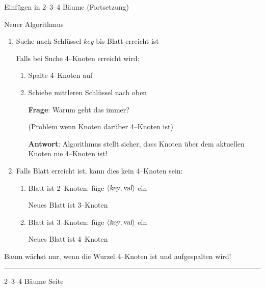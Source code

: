 
\begin{slide}{}
\normalsize

\begin{center}
Einf\"ugen in 2--3--4 B\"aume (Fortsetzung)
\end{center}
\vspace*{0.5cm}

\footnotesize
Neuer Algorithmus
\begin{enumerate}
\item Suche nach Schl\"ussel \textsl{key} bis Blatt erreicht ist

      Falls bei Suche 4--Knoten erreicht wird:
      \begin{enumerate}
      \item Spalte 4--Knoten auf
      \item Schiebe mittleren Schl\"ussel nach oben

            \textbf{Frage}: Warum geht das immer?
           
            (Problem wenn Knoten dar\"uber 4--Knoten ist)
            \vspace*{0.5cm}

            \textbf{Antwort}: Algorithmus stellt sicher, dass Knoten \"uber dem aktuellen
            Knoten nie 4--Knoten ist!
      \end{enumerate}
\item Falls Blatt erreicht ist, kann dies kein 4--Knoten sein:
      \begin{enumerate}
      \item Blatt ist 2--Knoten: f\"uge $\langle \textsl{key}, \textsl{val} \rangle$ ein

            Neues Blatt ist 3--Knoten

      \item Blatt ist 3--Knoten: f\"uge $\langle \textsl{key}, \textsl{val} \rangle$ ein

            Neues Blatt ist 4--Knoten 
      \end{enumerate}
\end{enumerate}

Baum w\"achst nur, wenn die Wurzel 4--Knoten ist und aufgespalten wird!


\vspace*{\fill}
\tiny \addtocounter{mypage}{1}
\rule{17cm}{1mm}
2--3--4 B\"aume  \hspace*{\fill} Seite 
\end{slide}

